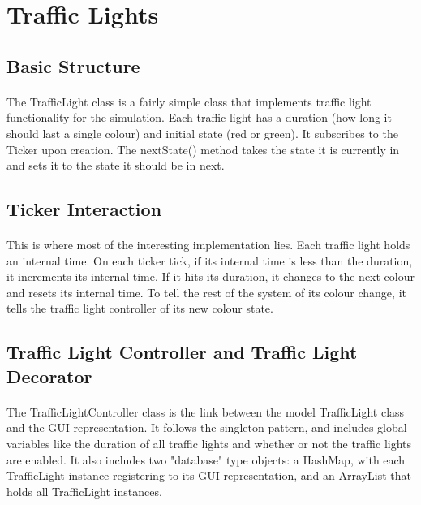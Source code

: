 \documentclass[a4paper,11pt,titlepage]{article}
\begin{document}
\section{Traffic Lights}\label{trafficlights}
\subsection{Basic Structure}
\paragraph{}
The TrafficLight class is a fairly simple class that implements traffic light functionality for the simulation. Each traffic light has a duration (how long it should last a single colour) and initial state (red or green). It subscribes to the Ticker upon creation. The nextState() method takes the state it is currently in and sets it to the state it should be in next.

\subsection{Ticker Interaction}
\paragraph{}
This is where most of the interesting implementation lies. Each traffic light holds an internal time. On each ticker tick, if its internal time is less than the duration, it increments its internal time. If it hits its duration, it changes to the next colour and resets its internal time. To tell the rest of the system of its colour change, it tells the traffic light controller of its new colour state.

\subsection{Traffic Light Controller and Traffic Light Decorator}
\paragraph{}
The TrafficLightController class is the link between the model TrafficLight class and the GUI representation. It follows the singleton pattern, and includes global variables like the duration of all traffic lights and whether or not the traffic lights are enabled. It also includes two "database" type objects: a HashMap, with each TrafficLight instance registering to its GUI representation, and an ArrayList that holds all TrafficLight instances.
\end{document}
